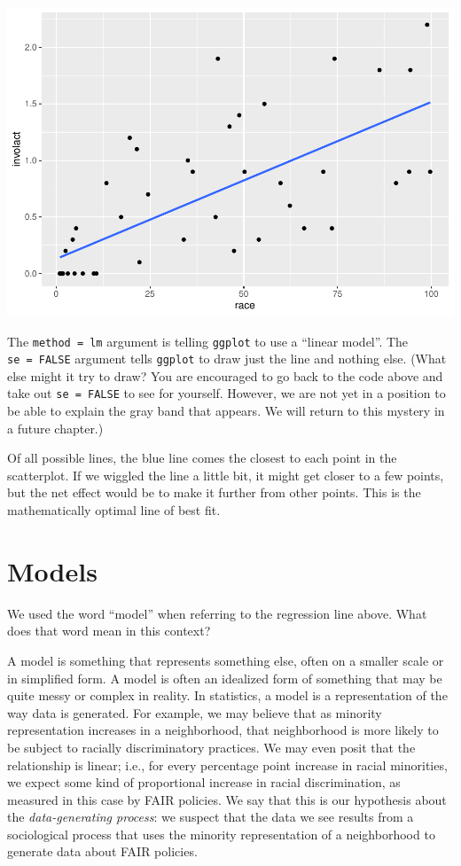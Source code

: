 \documentclass[
]{book}
\begin{document}
\includegraphics{intro_stats_files/figure-latex/unnamed-chunk-178-1.pdf}

The \texttt{method\ =\ lm} argument is telling \texttt{ggplot} to use a ``linear model''. The \texttt{se\ =\ FALSE} argument tells \texttt{ggplot} to draw just the line and nothing else. (What else might it try to draw? You are encouraged to go back to the code above and take out \texttt{se\ =\ FALSE} to see for yourself. However, we are not yet in a position to be able to explain the gray band that appears. We will return to this mystery in a future chapter.)

Of all possible lines, the blue line comes the closest to each point in the scatterplot. If we wiggled the line a little bit, it might get closer to a few points, but the net effect would be to make it further from other points. This is the mathematically optimal line of best fit.

\hypertarget{regression-models}{%
\section{Models}\label{regression-models}}

We used the word ``model'' when referring to the regression line above. What does that word mean in this context?

A model is something that represents something else, often on a smaller scale or in simplified form. A model is often an idealized form of something that may be quite messy or complex in reality. In statistics, a model is a representation of the way data is generated. For example, we may believe that as minority representation increases in a neighborhood, that neighborhood is more likely to be subject to racially discriminatory practices. We may even posit that the relationship is linear; i.e., for every percentage point increase in racial minorities, we expect some kind of proportional increase in racial discrimination, as measured in this case by FAIR policies. We say that this is our hypothesis about the \emph{data-generating process}: we suspect that the data we see results from a sociological process that uses the minority representation of a neighborhood to generate data about FAIR policies.
\end{document}
